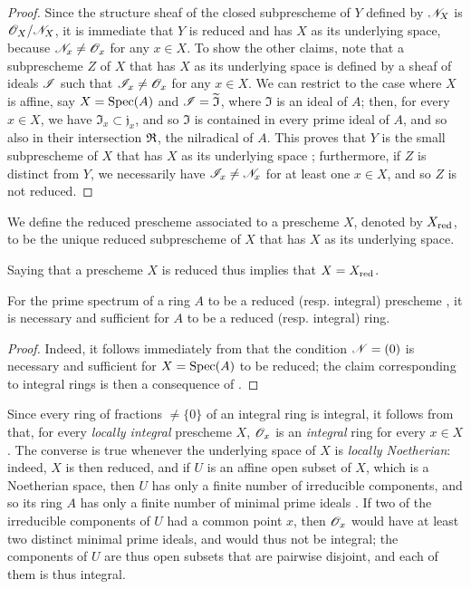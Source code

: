\begin{proof}
\label{proof-1.5.1.2}
Since the structure sheaf of the closed subprescheme of $Y$ defined by $\mathscr{N}_X$ is $\mathscr{O}_X/\mathscr{N}_X$, it is immediate that $Y$ is reduced and has $X$ as its underlying space, because $\mathscr{N}_x\neq\mathscr{O}_x$ for any $x\in X$.
To show the other claims, note that a subprescheme $Z$ of $X$ that has $X$ as its underlying space is defined by a sheaf of ideals $\mathscr{I}$  such that $\mathscr{I}_x\neq\mathscr{O}_x$ for any $x\in X$.
We can restrict to the case where $X$ is affine, say $X=\operatorname{Spec}(A)$ and $\mathscr{I}=\widetilde{\mathfrak{I}}$, where $\mathfrak{I}$ is an ideal of $A$;
then, for every $x\in X$, we have $\mathfrak{I}_x\subset\mathfrak{j}_x$, and so $\mathfrak{I}$ is contained in every prime ideal of $A$, and so also in their intersection $\mathfrak{R}$, the nilradical of $A$.
This proves that $Y$ is the small subprescheme of $X$ that has $X$ as its underlying space ;
furthermore, if $Z$ is distinct from $Y$, we necessarily have $\mathscr{I}_x\neq\mathscr{N}_x$ for at least one $x\in X$, and so  $Z$ is not reduced.
\end{proof}

\begin{definition}[5.1.3]
\label{1.5.1.3}
We define the reduced prescheme associated to a prescheme $X$, denoted by $X_{\mathrm{red}}$, to be the unique reduced subprescheme of $X$ that has $X$ as its underlying space.
\end{definition}

Saying that a prescheme $X$ is reduced thus implies that $X=X_{\mathrm{red}}$.

\begin{proposition}[5.1.4]
\label{1.5.1.4}
For the prime spectrum of a ring $A$ to be a reduced (resp. integral) prescheme , it is necessary and sufficient for $A$ to be a reduced (resp. integral) ring.
\end{proposition}

\begin{proof}
\label{proof-1.5.1.4}
Indeed, it follows immediately from  that the condition $\mathscr{N}=(0)$ is necessary and sufficient for $X=\operatorname{Spec}(A)$ to be reduced;
the claim corresponding to integral rings is then a consequence of .
\end{proof}

Since every ring of fractions $\neq\{0\}$ of an integral ring is integral, it follows from  that, for every \emph{locally integral} prescheme $X$, $\mathscr{O}_x$ is an \emph{integral} ring for every $x\in X$.
The converse is true whenever the underlying space of $X$ is \emph{locally Noetherian}:
indeed, $X$ is then reduced, and if $U$ is an affine open subset of $X$, which is a Noetherian space, then $U$ has only a finite number of irreducible components, and so its ring $A$ has only a finite number of minimal prime ideals .
If two of the irreducible components of $U$ had a common point $x$, then $\mathscr{O}_x$ would have at least two distinct minimal prime ideals, and would thus not be integral;
the components of $U$ are thus open subsets that are pairwise disjoint, and each of them is thus integral.

